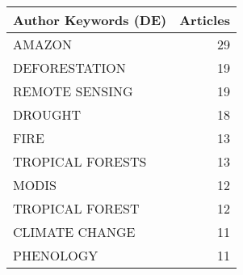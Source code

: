 
\begin{tabular}{lr}
\toprule
Author Keywords (DE) & Articles\\
\midrule
AMAZON & 29\\
DEFORESTATION & 19\\
REMOTE SENSING & 19\\
DROUGHT & 18\\
FIRE & 13\\
\addlinespace
TROPICAL FORESTS & 13\\
MODIS & 12\\
TROPICAL FOREST & 12\\
CLIMATE CHANGE & 11\\
PHENOLOGY & 11\\
\bottomrule
\end{tabular}